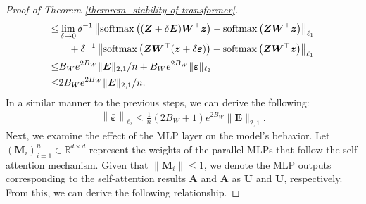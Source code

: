 \begin{proof}[Proof of Theorem \ref{therorem_stability of transformer}]
\begin{align}
 \leq &\lim _{\delta \rightarrow 0} \delta^{-1}\left\|\operatorname{softmax}\left((\boldsymbol{Z}+\delta \boldsymbol{E}) \boldsymbol{W}^{\top} \boldsymbol{z}\right)-\operatorname{softmax}\left(\boldsymbol{Z} \boldsymbol{W}^{\top} \boldsymbol{z}\right)\right\|_{\ell_1}\notag \\
&\quad +\delta^{-1}\left\|\operatorname{softmax}\left(\boldsymbol{Z} \boldsymbol{W}^{\top}(\boldsymbol{z}+\delta \boldsymbol{\varepsilon})\right)-\operatorname{softmax}\left(\boldsymbol{Z} \boldsymbol{W}^{\top} \boldsymbol{z}\right)\right\|_{\ell_1} \notag\\
\leq& B_W e^{2 B_W}\|\boldsymbol{E}\|_{2,1} / n+B_W e^{2 B_W}\|\boldsymbol{\varepsilon}\|_{\ell_2}\notag \\
 \leq& 2 B_W e^{2 B_W} \|\boldsymbol{E}\|_{2,1}/ n .
\end{align}
In a similar manner to the previous steps, we can derive the following:
\begin{align}
   \left \|\bar{\boldsymbol{\varepsilon}}\right\|_{\ell_2}\leq  \frac{1}{n}(2 B_W+1) e^{2 B_W} \|\boldsymbol{E}\|_{2,1}.
\end{align}
Next, we examine the effect of the MLP layer on the model's behavior. Let $\left(\boldsymbol{M}_i\right)_{i=1}^n \in \mathbb{R}^{d \times d}$ represent the weights of the parallel MLPs that follow the self-attention mechanism. Given that $\left\|\boldsymbol{M}_i\right\| \leq 1$, we denote the MLP outputs corresponding to the self-attention results $\boldsymbol{A}$ and $\boldsymbol{\bar{A}}$ as $\boldsymbol{U}$ and $\boldsymbol{\bar{U}}$, respectively. From this, we can derive the following relationship.


\end{proof}

